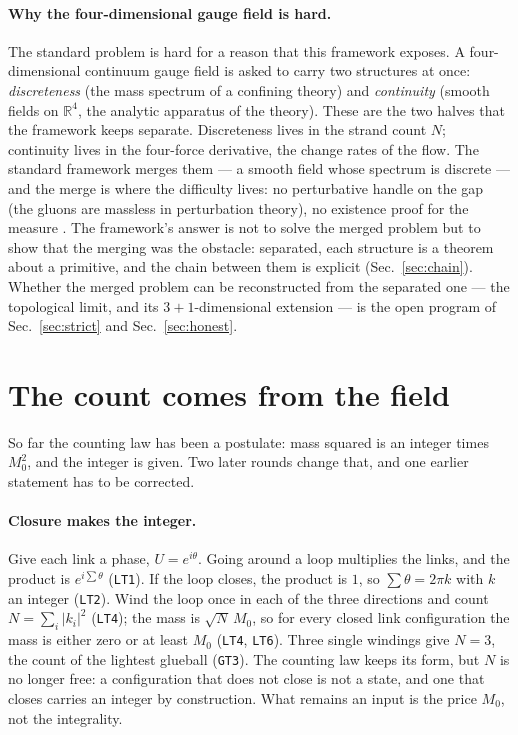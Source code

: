 \documentclass[aps,prd,preprint,superscriptaddress,amsmath,amssymb]{revtex4-2}
\begin{document}
\paragraph{Why the four-dimensional gauge field is hard.}
The standard problem is hard for a reason that this framework
exposes.  A four-dimensional continuum gauge field is asked to carry
two structures at once: \emph{discreteness} (the mass spectrum of a
confining theory) and \emph{continuity} (smooth fields on
$\mathbb{R}^4$, the analytic apparatus of the theory).  These are
the two halves that the framework keeps separate.  Discreteness
lives in the strand count $N$; continuity lives in the four-force
derivative, the change rates of the flow.  The standard framework
merges them --- a smooth field whose spectrum is discrete --- and
the merge is where the difficulty lives: no perturbative handle on
the gap (the gluons are massless in perturbation theory), no
existence proof for the measure \cite{jaffe2000yang,weinberg1995quantum}.
The framework's answer is not to solve the merged problem but to
show that the merging was the obstacle: separated, each structure
is a theorem about a primitive, and the chain between them is
explicit (Sec.~\ref{sec:chain}).  Whether the merged problem can be
reconstructed from the separated one --- the topological limit, and
its $3{+}1$-dimensional extension --- is the open program of
Sec.~\ref{sec:strict} and Sec.~\ref{sec:honest}.

\section{The count comes from the field}
\label{sec:closure}

So far the counting law has been a postulate: mass squared is an integer
times $M_0^2$, and the integer is given.  Two later rounds change that, and
one earlier statement has to be corrected.

\paragraph{Closure makes the integer.}
Give each link a phase, $U=e^{i\theta}$.  Going around a loop multiplies the
links, and the product is $e^{i\sum\theta}$ (\texttt{LT1}).  If the loop
closes, the product is $1$, so $\sum\theta=2\pi k$ with $k$ an integer
(\texttt{LT2}).  Wind the loop once in each of the three directions and count
$N=\sum_i|k_i|^2$ (\texttt{LT4}); the mass is $\sqrt N\,M_0$, so for every
closed link configuration the mass is either zero or at least $M_0$
(\texttt{LT4}, \texttt{LT6}).  Three single windings give $N=3$, the count of
the lightest glueball (\texttt{GT3}).  The counting law keeps its form, but
$N$ is no longer free: a configuration that does not close is not a state, and
one that closes carries an integer by construction.  What remains an input is
the price $M_0$, not the integrality.
\end{document}
